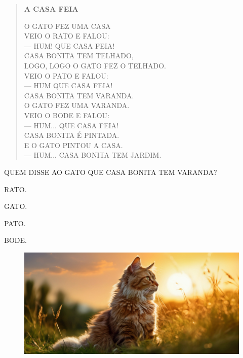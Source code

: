 \begin{myquote}
\begin{verse}
\textbf{A CASA FEIA}

O GATO FEZ UMA CASA\\
VEIO O RATO E FALOU:\\
--- HUM! QUE CASA FEIA!\\
CASA BONITA TEM TELHADO,\\
LOGO, LOGO O GATO FEZ O TELHADO.\\
VEIO O PATO E FALOU:\\
--- HUM QUE CASA FEIA!\\
CASA BONITA TEM VARANDA.\\
O GATO FEZ UMA VARANDA.\\
VEIO O BODE E FALOU:\\
--- HUM... QUE CASA FEIA!\\
CASA BONITA É PINTADA.\\
E O GATO PINTOU A CASA.\\
--- HUM... CASA BONITA TEM JARDIM.\\
\end{verse}

\end{myquote}	

QUEM DISSE AO GATO QUE CASA BONITA TEM VARANDA? 

\begin{multicols}{2}
\begin{escolha}
\item RATO.

\item GATO.

\item PATO.

\item BODE.
\end{escolha}
\end{multicols}

\begin{figure}[H]
\includegraphics[width=\textwidth]{media/image271.png}
\end{figure}

